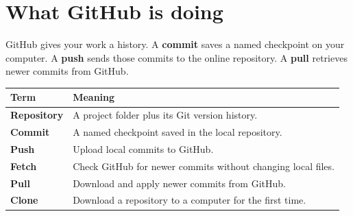 \documentclass[11pt,a4paper]{article}
\begin{document}
\clearpage
\section{What GitHub is doing}

GitHub gives your work a history. A \textbf{commit} saves a named checkpoint on your
computer. A \textbf{push} sends those commits to the online repository. A \textbf{pull}
retrieves newer commits from GitHub.

\begin{center}
\end{center}

\begin{center}
\begin{tabularx}{0.94\textwidth}{>{\bfseries}p{24mm}Y}
\toprule
Term & Meaning\\
\midrule
Repository & A project folder plus its Git version history.\\
Commit & A named checkpoint saved in the local repository.\\
Push & Upload local commits to GitHub.\\
Fetch & Check GitHub for newer commits without changing local files.\\
Pull & Download and apply newer commits from GitHub.\\
Clone & Download a repository to a computer for the first time.\\
\bottomrule
\end{tabularx}
\end{center}
\end{document}
